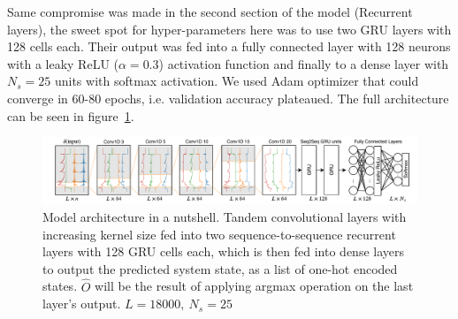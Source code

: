 Same compromise was made in the second section of the model (Recurrent layers), the sweet spot for hyper-parameters here was to use two GRU layers with 128 cells each. Their output was fed into a fully connected layer with 128 neurons with a leaky ReLU ($\alpha=0.3$) activation function \cite{maas2013rectifier} and finally to a dense layer with $N_s=25$ units with softmax activation.
We used Adam optimizer \cite{kingma2014adam} that could converge in 60-80 epochs, i.e. validation accuracy plateaued. The full architecture can be seen in figure~\ref{fig:model_arch}.
\begin{figure}
    \centering
    \includegraphics[width=\linewidth]{ASE_files/Convolutional_Net.pdf}
    \caption{Model architecture in a nutshell. Tandem convolutional layers with increasing kernel size fed into two sequence-to-sequence recurrent layers with 128 GRU cells each, which is then fed into dense layers to output the predicted system state, as a list of one-hot encoded states. $\hat{O}$ will be the result of applying argmax operation on the last layer's output. $L=18000,\: N_s=25$}
    \label{fig:model_arch}
\end{figure}


